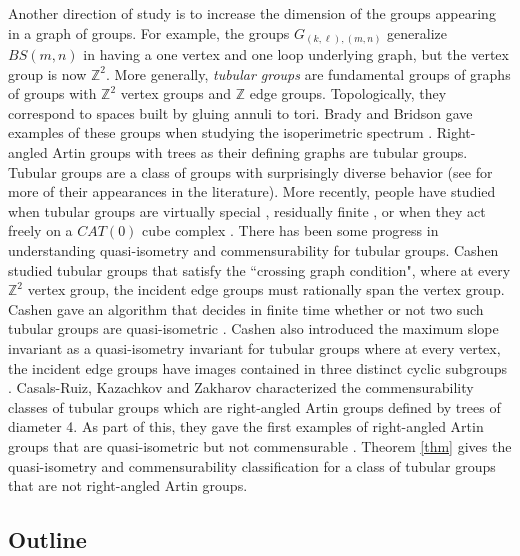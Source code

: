 \documentclass[10pt]{article}
\def\integers{{\mathbb{Z}}}
\theoremstyle{definition}
\begin{document}
Another direction of study is to increase the dimension of the  groups appearing in a graph of groups. For example, the groups $G_{(k,\ell),(m,n)}$ generalize  $BS(m,n)$ in having a one vertex and one loop underlying graph, but the vertex group is now $\integers^2$. More generally, \textit{tubular groups} are fundamental groups of graphs of groups with $\integers^2$ vertex groups and $\integers$ edge groups. Topologically, they correspond to spaces built by gluing annuli to tori. Brady and Bridson gave examples of these groups when studying the isoperimetric spectrum \cite{BradyBridson}. Right-angled Artin groups with trees as their defining graphs are tubular groups. Tubular groups are a class of groups with surprisingly diverse behavior (see \cite{Resfinite} for more of their appearances in the literature). More recently, people have studied when tubular groups  are virtually special \cite{WoodhouseSpecial}, residually finite \cite{Resfinite}, or when they act freely on a $CAT(0)$ cube complex \cite{Cat0}. There has been some progress in understanding  quasi-isometry and commensurability for tubular groups. 
Cashen studied tubular groups that satisfy the ``crossing graph condition", where at every  $\integers^2$ vertex group, the incident edge groups must rationally span the vertex group. Cashen gave an algorithm that decides in finite time  whether or not two such tubular groups are quasi-isometric \cite{Cashen}. Cashen also introduced the maximum slope invariant as a quasi-isometry invariant for tubular groups where at every vertex, the incident edge groups have images contained in three distinct cyclic subgroups \cite{CashenMaxSlope}. Casals-Ruiz, Kazachkov and Zakharov characterized the commensurability classes of tubular groups which are right-angled Artin groups defined by trees of diameter 4. As part of this, they gave the first examples of right-angled Artin groups  that are quasi-isometric but not commensurable \cite{CRKZRAAGs}. Theorem \ref{thm} gives the quasi-isometry and commensurability classification for a class of tubular groups that are not right-angled Artin groups. 









\subsection{Outline}
\end{document}
